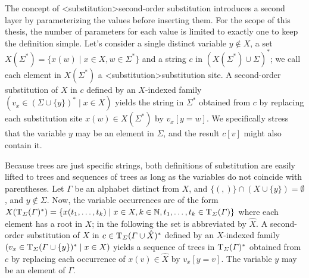 \documentclass[../document.tex]{subfiles}
\begin{document}
    The concept of <substitution>{second-order substitution} introduces a second layer by parameterizing the values before inserting them.
    For the scope of this thesis, the number of parameters for each value is limited to exactly one to keep the definition simple.
    Let's consider a single distinct variable \(y \notin X\), a set \(X(\varSigma^*) = \{ x(w) \mid x \in X, w \in \varSigma^* \}\) and a string \(c\) in \((X(\varSigma^*) \cup \varSigma)^*\); we call each element in \(X(\varSigma^*)\) a <substitution>{substitution site}.
    A second-order substitution of \(X\) in \(c\) defined by an \(X\)-indexed family \((v_x \in (\varSigma \cup \{y\})^* \mid x \in X)\) yields the string in \(\varSigma^*\) obtained from \(c\) by replacing each substitution site \(x(w) \in X(\varSigma^*)\) by \(v_x[y=w]\).
    We specifically stress that the variable \(y\) may be an element in \(\varSigma\), and the result \(c[v]\) might also contain it.

    Because trees are just specific strings, both definitions of substitution are easily lifted to trees and sequences of trees as long as the variables do not coincide with parentheses.
    Let \(\varGamma\) be an alphabet distinct from \(X\), and \(\{ (, ) \} \cap (X \cup \{y\}) = \emptyset\), and \(y \notin \varSigma\).
    Now, the variable occurrences are of the form \(X(\operatorname{T}_\varSigma(\varGamma)^*) = \{x(t_1, \ldots, t_k) \mid x \in X, k \in \mathbb{N}, t_1, \ldots, t_k \in \operatorname{T}_{\varSigma}(\varGamma)\}\) where each element has a root in \(X\); in the following the set is abbreviated by \(\hat{X}\).
    A second-order substitution of \(X\) in \(c \in \operatorname{T}_\varSigma(\varGamma \cup \hat{X})^*\) defined by an \(X\)-indexed family \((v_x \in \operatorname{T}_\varSigma(\varGamma \cup \{y\})^* \mid x \in X)\) yields a sequence of trees in \(\operatorname{T}_\varSigma(\varGamma)^*\) obtained from \(c\) by replacing each occurrence of \(x(v) \in \hat{X}\) by \(v_x[y=v]\).
    The variable \(y\) may be an element of \(\varGamma\).
\end{document}
